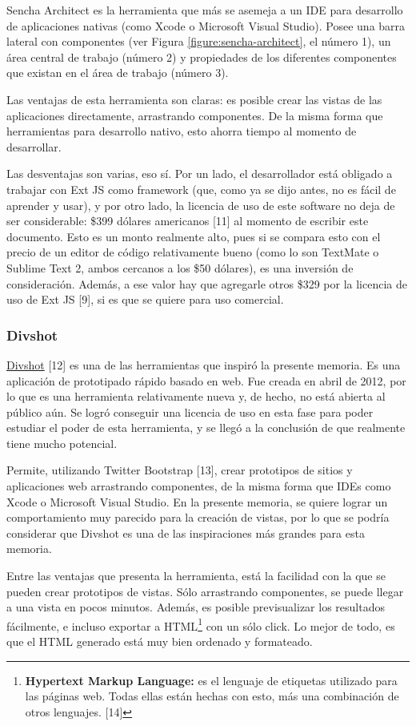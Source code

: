 \documentclass[12pt,titlepage,]{article}
\begin{document}
Sencha Architect es la herramienta que más se asemeja a un IDE para
desarrollo de aplicaciones nativas (como Xcode o Microsoft Visual
Studio). Posee una barra lateral con componentes (ver Figura
\ref{figure:sencha-architect}, el número 1), un área central de trabajo
(número 2) y propiedades de los diferentes componentes que existan en el
área de trabajo (número 3).

Las ventajas de esta herramienta son claras: es posible crear las vistas
de las aplicaciones directamente, arrastrando componentes. De la misma
forma que herramientas para desarrollo nativo, esto ahorra tiempo al
momento de desarrollar.

Las desventajas son varias, eso sí. Por un lado, el desarrollador está
obligado a trabajar con Ext JS como framework (que, como ya se dijo
antes, no es fácil de aprender y usar), y por otro lado, la licencia de
uso de este software no deja de ser considerable: \$399 dólares
americanos {[}11{]} al momento de escribir este documento. Esto es un
monto realmente alto, pues si se compara esto con el precio de un editor
de código relativamente bueno (como lo son TextMate o Sublime Text 2,
ambos cercanos a los \$50 dólares), es una inversión de consideración.
Además, a ese valor hay que agregarle otros \$329 por la licencia de uso
de Ext JS {[}9{]}, si es que se quiere para uso comercial.

\subsubsection{Divshot}

\href{http://divshot.com/}{Divshot} {[}12{]} es una de las herramientas
que inspiró la presente memoria. Es una aplicación de prototipado rápido
basado en web. Fue creada en abril de 2012, por lo que es una
herramienta relativamente nueva y, de hecho, no está abierta al público
aún. Se logró conseguir una licencia de uso en esta fase para poder
estudiar el poder de esta herramienta, y se llegó a la conclusión de que
realmente tiene mucho potencial.

Permite, utilizando Twitter Bootstrap {[}13{]}, crear prototipos de
sitios y aplicaciones web arrastrando componentes, de la misma forma que
IDEs como Xcode o Microsoft Visual Studio. En la presente memoria, se
quiere lograr un comportamiento muy parecido para la creación de vistas,
por lo que se podría considerar que Divshot es una de las inspiraciones
más grandes para esta memoria.

Entre las ventajas que presenta la herramienta, está la facilidad con la
que se pueden crear prototipos de vistas. Sólo arrastrando componentes,
se puede llegar a una vista en pocos minutos. Además, es posible
previsualizar los resultados fácilmente, e incluso exportar a
HTML\footnote{\textbf{Hypertext Markup Language:} es el lenguaje de
  etiquetas utilizado para las páginas web. Todas ellas están hechas con
  esto, más una combinación de otros lenguajes. {[}14{]}} con un sólo
click. Lo mejor de todo, es que el HTML generado está muy bien ordenado
y formateado.
\end{document}
